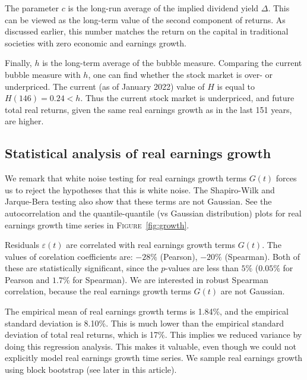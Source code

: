\documentclass[12pt]{amsart}
\theoremstyle{definition}
\begin{document}
The parameter $c$ is the long-run average of the implied dividend yield 
$\Delta$. This can be viewed as the long-term value of the second component of returns. As discussed earlier, this number matches the return on the capital in traditional societies with zero economic and earnings growth. 

Finally, $h$ is the long-term average of the bubble measure. Comparing the current bubble measure with $h$, one can find whether the stock market is over- or underpriced. The current (as of January 2022) value of $H$ is equal to $H(146) = 0.24 < h$. Thus the current stock market is underpriced, and future total real returns, given the same real earnings growth as in the last 151 years, are higher.

\subsection{Statistical analysis of real earnings growth}
We remark that white noise testing for real earnings growth terms $G(t)$ forces us to reject the hypotheses that this is white noise. The Shapiro-Wilk and Jarque-Bera testing also show that these terms are not Gaussian. See the autocorrelation and the quantile-quantile (vs Gaussian distribution) plots for real earnings growth time series in \textsc{Figure}~\ref{fig:growth}. 

Residuals $\varepsilon(t)$ are correlated with real earnings growth terms $G(t)$. The values of corelation coefficients are: $-28\%$ (Pearson), $-20\%$ (Spearman). Both of these are statistically significant, since the $p$-values are less than $5\%$ ($0.05\%$ for Pearson and $1.7\%$ for Spearman). We are interested in robust Spearman correlation, because the real earnings growth terms $G(t)$ are not Gaussian. 

The empirical mean of real earnings growth terms is 1.84\%, and the empirical standard deviation is 8.10\%. This is much lower than the empirical standard deviation of total real returns, which is 17\%. This implies we reduced variance by doing this regression analysis. This makes it valuable, even though we could not explicitly model real earnings growth time series. We sample real earnings growth using block bootstrap (see later in this article). 
\end{document}
